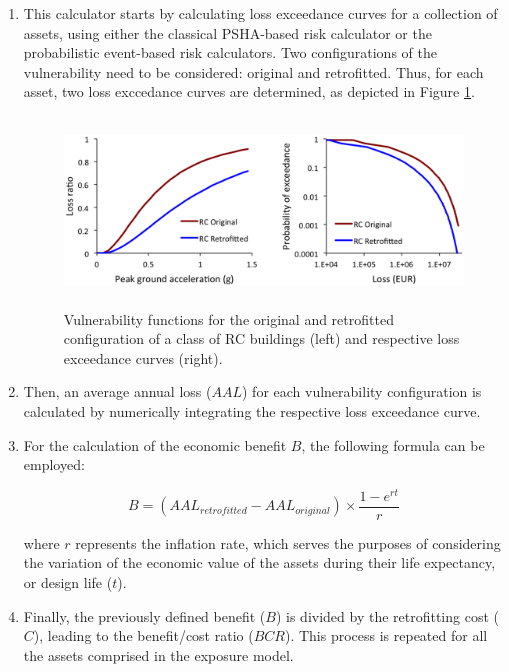 \begin{enumerate}
\item This calculator starts by calculating loss exceedance curves for a collection of \glspl{asset}, using either the classical PSHA-based risk calculator or the probabilistic event-based risk calculators. Two configurations of the vulnerability need to be considered: original and retrofitted. Thus, for each \gls{asset}, two loss exccedance curves are determined, as depicted in Figure \ref{fig:VulLosscurve}.

\begin{figure}[ht]
\centering
\includegraphics[width=12cm,height=5cm]{./figures/risk/VulnerabilityLosscurve.eps}
\caption{Vulnerability functions for the original and retrofitted configuration of a class of RC buildings (left) and respective loss exceedance curves (right).}
\label{fig:VulLosscurve}
\end{figure}

\item Then, an average annual loss ($AAL$) for each vulnerability configuration is calculated by numerically integrating the respective loss exceedance curve.  

\item For the calculation of the economic benefit $B$, the following formula can be employed:

\begin{equation}
B=(AAL_{retrofitted}-AAL_{original})\times\frac{1-e^{rt}}{r}
\end{equation}

where $r$ represents the inflation rate, which serves the purposes of considering the variation of the economic value of the \glspl{asset} during their life expectancy, or design life ($t$).

\item Finally, the previously defined benefit ($B$) is divided by the retrofitting cost ($C$), leading to the benefit/cost ratio ($BCR$). This process is repeated for all the \glspl{asset} comprised in the \gls{exposure model}.

\end{enumerate}

